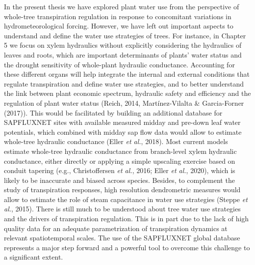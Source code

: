 \documentclass[11pt,twoside]{reedthesis}
\begin{document}
In the present thesis we have explored plant water use from the
perspective of whole-tree transpiration regulation in response to
concomitant variations in hydrometeorological forcing. However, we have
left out important aspects to understand and define the water use
strategies of trees. For instance, in Chapter 5 we focus on xylem
hydraulics without explicitly considering the hydraulics of leaves and
roots, which are important determinants of plants' water status and the
drought sensitivity of whole-plant hydraulic conductance. Accounting for
these different organs will help integrate the internal and external
conditions that regulate transpiration and define water use strategies,
and to better understand the link between plant economic spectrum,
hydraulic safety and efficiency and the regulation of plant water status
(Reich, 2014, Martínez-Vilalta \& Garcia-Forner (2017)). This would be
facilitated by building an additional database for SAPFLUXNET sites with
available measured midday and pre-down leaf water potentials, which
combined with midday sap flow data would allow to estimate whole-tree
hydraulic conductance (Eller \emph{et al.}, 2018). Most current models
estimate whole-tree hydraulic conductance from branch-level xylem
hydraulic conductance, either directly or applying a simple upscaling
exercise based on conduit tapering (e.g., Christoffersen \emph{et al.},
2016; Eller \emph{et al.}, 2020), which is likely to be inaccurate and
biased across species. Besides, to complement the study of transpiration
responses, high resolution dendrometric measures would allow to estimate
the role of steam capacitance in water use strategies (Steppe \emph{et
al.}, 2015). There is still much to be understood about tree water use
strategies and the drivers of transpiration regulation. This is in part
due to the lack of high quality data for an adequate parametrization of
transpiration dynamics at relevant spatiotemporal scales. The use of the
SAPFLUXNET global database represents a major step forward and a
powerful tool to overcome this challenge to a significant extent.\par
\newpage
\end{document}
